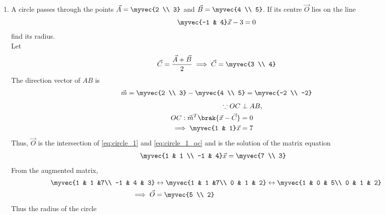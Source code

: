 \renewcommand{\theequation}{\theenumi}
\begin{enumerate}[label=\arabic*.,ref=\thesubsection.\theenumi]
\item A circle passes through the points $\vec{A}=\myvec{2 \\ 3}$ and $\vec{B} = \myvec{4 \\  5}$.  If its centre $\vec{O}$ lies on the 
line
\begin{equation}
\label{eq:circle_1}
\myvec{-1 & 4}\vec{x} - 3 =0
\end{equation}
%
find its radius.
\\
\solution Let 
\begin{align}
\vec{C}=\frac{\vec{A}+\vec{B}}{2}
\implies \vec{C}=\myvec{3 \\ 4}
\label{eq:circle_1_c}
\end{align}
The direction vector of $AB$ is 
\begin{align}
\label{eq:circle_1_m}
\vec{m} = \myvec{2 \\ 3}-\myvec{4 \\  5}
= \myvec{-2 \\ -2}
\end{align}
\begin{align}
\because OC &\perp AB,
\nonumber \\
OC: \vec{m}^T\brak{\vec{x}-\vec{C}}&=0
\nonumber \\
\implies \myvec{1 & 1}\vec{x} &= 7
\label{eq:circle_1_oc}
\end{align}
%
Thus, $\vec{O}$ is the intersection of \eqref{eq:circle_1}
and \eqref{eq:circle_1_oc} and is the solution of the matrix equation
\begin{align}
 \myvec{1 & 1 \\ -1 & 4}\vec{x} &= \myvec{7 \\ 3}
\label{eq:circle_1_matrix}
\end{align}
%
From the augmented matrix,
\begin{align}
 \myvec{1 & 1 &7\\ -1 & 4 & 3}&\leftrightarrow  \myvec{1 & 1 &7\\ 0 & 1 & 2}\leftrightarrow \myvec{1 & 0 & 5\\ 0 & 1 & 2} 
\nonumber \\
\implies \vec{O} &= \myvec{5 \\ 2}
\label{eq:circle_1_o}
\end{align}
%
Thus the radius of the circle 
\begin{align}
\label{eq:circle_1_r}

\end{align}
\end{enumerate}
